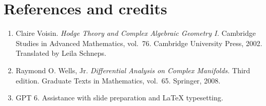 \documentclass[11pt]{article}
\begin{document}
\section*{References and credits}
\begin{enumerate}
\item Claire Voisin. \emph{Hodge Theory and Complex Algebraic Geometry I.}
Cambridge Studies in Advanced Mathematics, vol.~76.
Cambridge University Press, 2002. Translated by Leila Schneps.
\item Raymond O. Wells, Jr. \emph{Differential Analysis on Complex Manifolds.}
Third edition. Graduate Texts in Mathematics, vol.~65.
Springer, 2008.
\item GPT 6. Assistance with slide preparation and LaTeX typesetting.
\end{enumerate}
\end{document}

